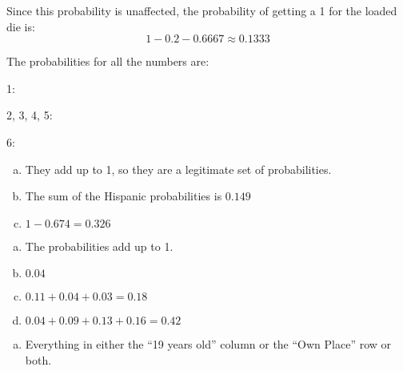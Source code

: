 \documentclass[letterpaper, landscape]{exam}
\begin{document}
\begin{description}
        Since this probability is unaffected, the probability of getting a 1 for
        the loaded die is:
        \[
          1 - 0.2 - 0.6667 \approx 0.1333
        \]

        The probabilities for all the numbers are:
        \begin{itemize*}
          \item 1: 
          \item 2, 3, 4, 5: 
          \item 6: 
        \end{itemize*}


      \newpage

      \item[40]
        \begin{enumerate}[(a)]
          \item They add up to 1, so they are a legitimate set of probabilities.

          \item The sum of the Hispanic probabilities is $\boxed{ 0.149 }$

          \item $1 - 0.674 = \boxed{ 0.326 }$
        \end{enumerate}

      \item[41]
        \begin{enumerate}[(a)]
          \item The probabilities add up to 1.

          \item $\boxed{ 0.04 }$

          \item $0.11 + 0.04 + 0.03 = \boxed{ 0.18 }$

          \item $0.04 + 0.09 + 0.13 + 0.16 = \boxed{ 0.42 }$

        \end{enumerate}

      \item[42]
        \begin{enumerate}[(a)]
          \item Everything in either the ``19 years old'' column or the ``Own Place'' row or both.


\end{enumerate}
\end{description}
\end{document}
